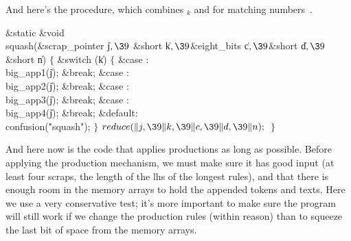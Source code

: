 And here's the  procedure, which combines ${}_k$ and
 for matching numbers~.

\Y\B\1\1\&{static} \&{void} \\{squash}(\&{scrap\_pointer} \|j${},\39{}$%
\&{short} \|k${},\39{}$\&{eight\_bits} \|c${},\39{}$\&{short} \|d${},\39{}$%
\&{short} \|n)\2\2\6
${}\{{}$\1\6
\&{switch} (\|k)\5
${}\{{}$\1\6
\4\&{case} :\5
\\{big\_app1}(\|j);\6
\&{break};\6
\4\&{case} :\5
\\{big\_app2}(\|j);\6
\&{break};\6
\4\&{case} :\5
\\{big\_app3}(\|j);\6
\&{break};\6
\4\&{case} :\5
\\{big\_app4}(\|j);\6
\&{break};\6
\4\&{default}:\5
\\{confusion}(\.{"squash"});\6
\4${}\}{}$\2\6
${}\\{reduce}(\|j,\39\|k,\39\|c,\39\|d,\39\|n);{}$\6
\4${}\}{}$\2\par
\fi

And here now is the code that applies productions as long as possible.
Before applying the production mechanism, we must make sure
it has good input (at least four scraps, the length of the lhs of the
longest rules), and that there is enough room in the memory arrays
to hold the appended tokens and texts.  Here we use a very
conservative test; it's more important to make sure the program
will still work if we change the production rules (within reason)
than to squeeze the last bit of space from the memory arrays.

